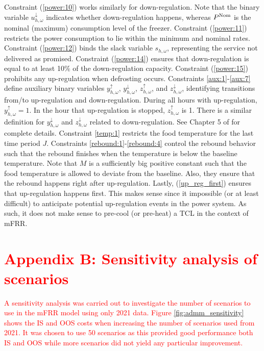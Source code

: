 \documentclass[11pt,a4paper]{article}
\begin{document}
%
Constraint (\ref{power:10}) works similarly for down-regulation. Note that the binary variable $u^{\downarrow}_{h,\omega}$ indicates whether down-regulation happens, whereas $P^{\rm{Nom}}$ is the nominal (maximum) consumption level of the freezer.
%
Constraint (\ref{power:11}) restricts the power consumption to lie within the minimum and nominal rates.
%
Constraint (\ref{power:12}) binds the slack variable $s_{h,\omega}$, representing the service not delivered as promised.
%
Constraint (\ref{power:14}) ensures that down-regulation is equal to at least 10\% of the down-regulation capacity.
%
Constraint (\ref{power:15}) prohibits any up-regulation when defrosting occurs.
%
Constraints \eqref{aux:1}-\eqref{aux:7} define auxiliary binary variables $y^{\uparrow}_{h,\omega}$, $y^{\downarrow}_{h,\omega}$, $z^{\uparrow}_{h,\omega}$, and $z^{\downarrow}_{h,\omega}$, identifying transitions from/to up-regulation and down-regulation.
During all hours with up-regulation, $y^{\uparrow}_{h,\omega}=1$. In the hour that up-regulation is stopped, $z^{\uparrow}_{h,\omega}$ is 1. There is a similar definition for $y^{\downarrow}_{h,\omega}$ and $z^{\downarrow}_{h,\omega}$ related to down-regulation.
See Chapter 5 of  \cite{morales2013integrating} for complete details.
%
Constraint \eqref{temp:1} restricts the food temperature for the last time period $J$.
%
Constraints \eqref{rebound:1}-\eqref{rebound:4} control the rebound behavior such that the rebound finishes when the temperature is below the baseline temperature. Note that $M$ is a sufficiently big positive constant such that the food temperature is allowed to deviate from the baseline. Also, they ensure that the rebound happens right after up-regulation.
%
Lastly, (\ref{up_reg_first}) ensures that up-regulation happens first. This makes sense since it impossible (or at least difficult) to anticipate potential up-regulation events in the power system. As such, it does not make sense to pre-cool (or pre-heat) a TCL in the context of mFRR.

\section*{\textcolor{red}{Appendix B: Sensitivity analysis of scenarios}}\label{appendix:B}

\textcolor{red}{A sensitivity analysis was carried out to investigate the number of scenarios to use in the mFRR model using only 2021 data. Figure \ref{fig:admm_sensitivity} shows the IS and OOS costs when increasing the number of scenarios used from 2021. It was chosen to use 50 scenarios as this provided good performance both IS and OOS while more scenarios did not yield any particular improvement.}
\end{document}
